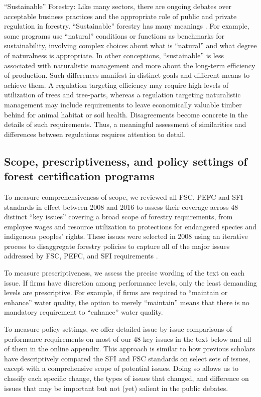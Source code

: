 \documentclass[
      12pt,
            Review ]{article}
\begin{document}
``Sustainable'' Forestry: Like many sectors, there are ongoing debates
over acceptable business practices and the appropriate role of public
and private regulation in forestry. ``Sustainable'' forestry has many
meanings \citep{McDermott2012}. For example, some programs use
``natural'' conditions or functions as benchmarks for sustainability,
involving complex choices about what is ``natural'' and what degree of
naturalness is appropriate. In other conceptions, ``sustainable'' is
less associated with naturalistic management and more about the
long-term efficiency of production. Such differences manifest in
distinct goals and different means to achieve them. A regulation
targeting efficiency may require high levels of utilization of trees and
tree-parts, whereas a regulation targeting naturalistic management may
include requirements to leave economically valuable timber behind for
animal habitat or soil health. Disagreements become concrete in the
details of such requirements. Thus, a meaningful assessment of
similarities and differences between regulations requires attention to
detail.

\subsection{Scope, prescriptiveness, and policy settings of forest
certification
programs}\label{scope-prescriptiveness-and-policy-settings-of-forest-certification-programs}

To measure comprehensiveness of scope, we reviewed all FSC, PEFC and SFI
standards in effect between 2008 and 2016 to assess their coverage
across 48 distinct ``key issues'' covering a broad scope of forestry
requirements, from employee wages and resource utilization to
protections for endangered species and indigenous peoples' rights. These
issues were selected in 2008 using an iterative process to disaggregate
forestry policies to capture all of the major issues addressed by FSC,
PEFC, and SFI requirements \citep{McDermott2010}.

To measure prescriptiveness, we assess the precise wording of the text
on each issue. If firms have discretion among performance levels, only
the least demanding levels are prescriptive. For example, if firms are
required to ``maintain or enhance'' water quality, the option to merely
``maintain'' means that there is no mandatory requirement to ``enhance''
water quality.

To measure policy settings, we offer detailed issue-by-issue comparisons
of performance requirements on most of our 48 key issues in the text
below and all of them in the online appendix. This approach is similar
to how previous scholars have descriptively compared the SFI and FSC
standards on select sets of issues, except with a comprehensive scope of
potential issues. Doing so allows us to classify each specific change,
the types of issues that changed, and difference on issues that may be
important but not (yet) salient in the public debates.
\end{document}
